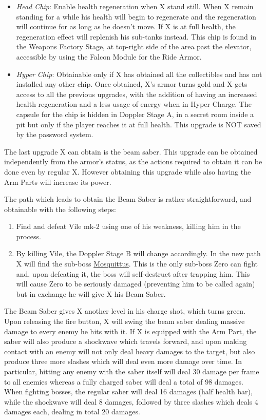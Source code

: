\begin{itemize}
	
	\item \emph{Head Chip}: Enable health regeneration when X stand still. When X remain standing for a while his health will begin to regenerate and the regeneration will continue for as long as he doesn't move. If X is at full health, the regeneration effect will replenish his sub-tanks instead. This chip is found in the Weapons Factory Stage, at top-right side of the area past the elevator, accessible by using the Falcon Module for the Ride Armor.
	
	\item \emph{Hyper Chip}: Obtainable only if X has obtained all the collectibles and has not installed any other chip. Once obtained, X's armor turns gold and X gets access to all the previous upgrades, with the addition of having an increased health regeneration and a less usage of energy when in Hyper Charge. The capsule for the chip is hidden in Doppler Stage A, in a secret room inside a pit but only if the player reaches it at full health. This upgrade is NOT saved by the password system.

\end{itemize}
The last upgrade X can obtain is the beam saber. This upgrade can be obtained independently from the armor's status, as the actions required to obtain it can be done even by regular X. However obtaining this upgrade while also having the Arm Parts will increase its power.

The path which leads to obtain the Beam Saber is rather straightforward, and obtainable with the following steps:
\begin{enumerate}
	\item Find and defeat Vile mk-2 using one of his weakness, killing him in the process.
	\item By killing Vile, the Doppler Stage B will change accordingly. In the new path X will find the sub-boss  \hyperlink{miniboss:Mosquittus}{Mosquittus}. This is the only sub-boss Zero can fight and, upon defeating it, the boss will self-destruct after trapping him. This will cause Zero to be seriously damaged (preventing him to be called again) but in exchange he will give X his Beam Saber.
\end{enumerate} 
The Beam Saber gives X another level in his charge shot, which turns green. Upon releasing the fire button, X will swing the beam saber dealing massive damage to every enemy he hits with it. If X is equipped with the Arm Part, the saber will also produce a shockwave which travels forward, and upon making contact with an enemy will not only deal heavy damages to the target, but also produce three more slashes which will deal even more damage over time. In particular, hitting any enemy with the saber itself will deal 30 damage per frame to all enemies whereas a fully charged saber will deal a total of 98 damages. When fighting bosses, the regular saber will deal 16 damages (half health bar), while the shockwave will deal 8 damages, followed by three slashes which deals 4 damages each, dealing in total 20 damages.

